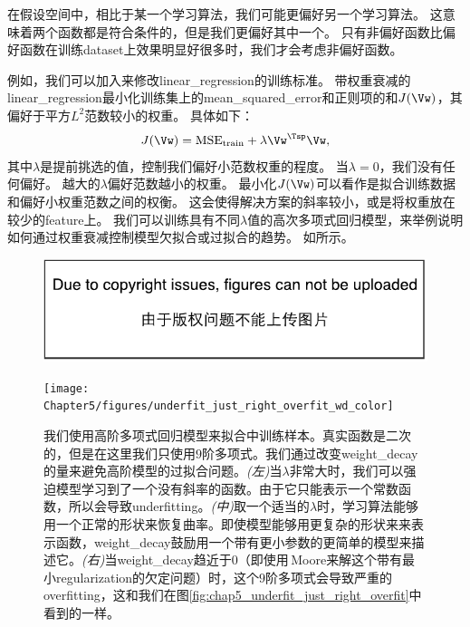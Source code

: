 在假设空间中，相比于某一个学习算法，我们可能更偏好另一个学习算法。
这意味着两个函数都是符合条件的，但是我们更偏好其中一个。
只有非偏好函数比偏好函数在训练\gls{dataset}上效果明显好很多时，我们才会考虑非偏好函数。


例如，我们可以加入来修改\gls{linear_regression}的训练标准。
带权重衰减的\gls{linear_regression}最小化训练集上的\gls{mean_squared_error}和正则项的和$J(\Vw)$，其偏好于平方$L^2$范数较小的权重。
具体如下：
\begin{equation}
    J(\Vw) = \text{MSE}_{\text{train}} + \lambda \Vw^\Tsp \Vw,
\end{equation}
其中$\lambda$是提前挑选的值，控制我们偏好小范数权重的程度。
当$\lambda =0$，我们没有任何偏好。
越大的$\lambda$偏好范数越小的权重。
最小化$J(\Vw)$可以看作是拟合训练数据和偏好小权重范数之间的权衡。
这会使得解决方案的斜率较小，或是将权重放在较少的\gls{feature}上。
我们可以训练具有不同$\lambda$值的高次多项式回归模型，来举例说明如何通过权重衰减控制模型欠拟合或过拟合的趋势。
如所示。

\begin{figure}[!htb]
\ifOpenSource
\centerline{\includegraphics{figure.pdf}}
\else
\centerline{\texttt{[image: Chapter5/figures/underfit\_just\_right\_overfit\_wd\_color]}}
\fi
\caption{我们使用高阶多项式回归模型来拟合中训练样本。真实函数是二次的，但是在这里我们只使用$9$阶多项式。我们通过改变\gls{weight_decay}的量来避免高阶模型的过拟合问题。\emph{(左)}当$\lambda$非常大时，我们可以强迫模型学习到了一个没有斜率的函数。由于它只能表示一个常数函数，所以会导致\gls{underfitting}。\emph{(中)}取一个适当的$\lambda$时，学习算法能够用一个正常的形状来恢复曲率。即使模型能够用更复杂的形状来来表示函数，\gls{weight_decay}鼓励用一个带有更小参数的更简单的模型来描述它。\emph{(右)}当\gls{weight_decay}趋近于$0$（即使用\,\gls{Moore}来解这个带有最小\gls{regularization}的欠定问题）时，这个$9$阶多项式会导致严重的\gls{overfitting}，这和我们在图\ref{fig:chap5_underfit_just_right_overfit}中看到的一样。}
\label{fig:chap5_underfit_just_right_overfit_wd_color}
\end{figure}

